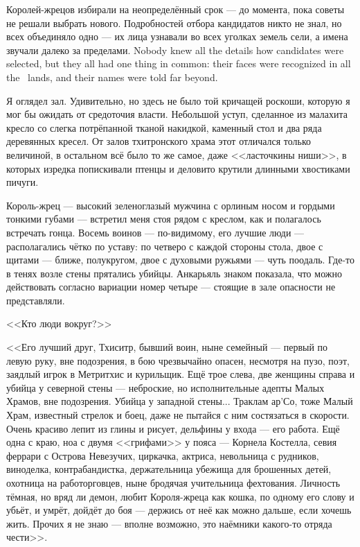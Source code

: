 Королей-жрецов избирали на неопределённый срок --- до момента, пока советы не решали выбрать нового.
{Подробностей отбора кандидатов никто не знал, но всех объединяло одно --- их лица узнавали во всех уголках земель сели, а имена звучали далеко за пределами.}
{Nobody knew all the details how candidates were selected, but they all had one thing in common: their faces were recognized in all the \Seli\ lands, and their names were told far beyond.}

Я оглядел зал.
Удивительно, но здесь не было той кричащей роскоши, которую я мог бы ожидать от средоточия власти.
Небольшой уступ, сделанное из малахита кресло со слегка потрёпанной тканой накидкой, каменный стол и два ряда деревянных кресел.
От залов тхитронского храма этот отличался только величиной, в остальном всё было то же самое, даже <<ласточкины ниши>>, в которых изредка попискивали птенцы и деловито крутили длинными хвостиками пичуги.

Король-жрец --- высокий зеленоглазый мужчина с орлиным носом и гордыми тонкими губами --- встретил меня стоя рядом с креслом, как и полагалось встречать гонца.
Восемь воинов --- по-видимому, его лучшие люди --- располагались чётко по уставу: по четверо с каждой стороны стола, двое с щитами --- ближе, полукругом, двое с духовыми ружьями --- чуть поодаль.
Где-то в тенях возле стены прятались убийцы.
Анкарьяль знаком показала, что можно действовать согласно вариации номер четыре --- стоящие в зале опасности не представляли.

<<Кто люди вокруг?>>

<<Его лучший друг, Тхиситр, бывший воин, ныне семейный --- первый по левую руку, вне подозрения, в бою чрезвычайно опасен, несмотря на пузо, поэт, заядлый игрок в Метритхис и курильщик.
Ещё трое слева, две женщины справа и убийца у северной стены --- неброские, но исполнительные адепты Малых Храмов, вне подозрения.
Убийца у западной стены... Траклам ар'Со, тоже Малый Храм, известный стрелок и боец, даже не пытайся с ним состязаться в скорости.
Очень красиво лепит из глины и рисует, дельфины у входа --- его работа.
Ещё одна с краю, ноа с двумя <<грифами>> у пояса --- Корнела Костелла, севия феррари с Острова Невезучих, циркачка, актриса, невольница с рудников, виноделка, контрабандистка, держательница убежища для брошенных детей, охотница на работорговцев, ныне бродячая учительница фехтования.
Личность тёмная, но вряд ли демон, любит Короля-жреца как кошка, по одному его слову и убьёт, и умрёт, дойдёт до боя --- держись от неё как можно дальше, если хочешь жить.
Прочих я не знаю --- вполне возможно, это наёмники какого-то отряда чести>>.

